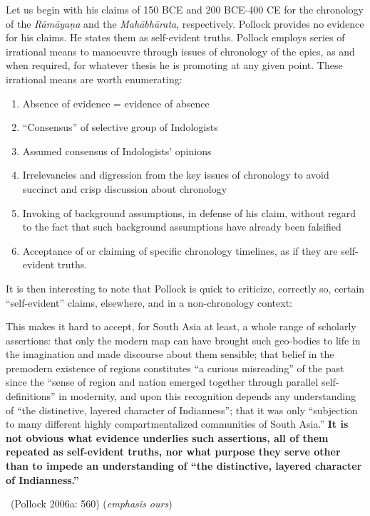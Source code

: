 Let us begin with his claims of 150 BCE and 200 BCE-400 CE for the chronology of the \textit{Rāmāyaṇa} and the \textit{Mahābhārata}, respectively. Pollock provides no evidence for his claims. He states them as self-evident truths. Pollock employs series of irrational means to manoeuvre through issues of chronology of the epics, as and when required, for whatever thesis he is promoting at any given point. These irrational means are worth enumerating:

\begin{enumerate}
\itemsep=0pt
\item Absence of evidence = evidence of absence

 \item “Consensus” of selective group of Indologists

 \item Assumed consensus of Indologists’ opinions

 \item Irrelevancies and digression from the key issues of chronology to avoid succinct and crisp discussion about chronology

 \item Invoking of background assumptions, in defense of his claim, without regard to the fact that such background assumptions have already been falsified

 \item Acceptance of or claiming of specific chronology timelines, as if they are self-evident truths.

\end{enumerate}

It is then interesting to note that Pollock is quick to criticize, correctly so, certain “self-evident” claims, elsewhere, and in a non-chronology context:

\begin{myquote}
This makes it hard to accept, for South Asia at least, a whole range of scholarly assertions: that only the modern map can have brought such geo-bodies to life in the imagination and made discourse about them sensible; that belief in the premodern existence of regions constitutes “a curious misreading” of the past since the “sense of region and nation emerged together through parallel self-deﬁnitions” in modernity, and upon this recognition depends any understanding of “the distinctive, layered character of Indianness”; that it was only “subjection to many different highly compartmentalized communities of South Asia.” \textbf{It is not obvious what evidence underlies such assertions, all of them repeated as self-evident truths, nor what purpose they serve other than to impede an understanding of “the distinctive, layered character of Indianness.”} 

~\hfill (Pollock 2006a: 560) (\textit{emphasis ours})
\end{myquote}


